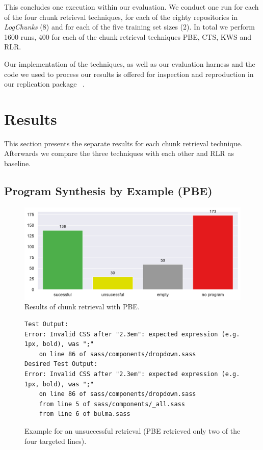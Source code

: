 This concludes one execution within our evaluation.
We conduct one run for each of the four chunk retrieval techniques,
for each of the eighty repositories in \emph{LogChunks} (8)
and for each of the five training set sizes (2).
In total we perform 1600 runs, 400 for each of the chunk retrieval
techniques PBE, CTS, KWS and RLR.

Our implementation of the techniques, as well as our evaluation
harness and the code we used to process our results is offered
for inspection and reproduction in our replication package
~\cite{brandt2020chunk-replication}.

\section{Results}
This section presents the separate results for each chunk retrieval
technique.
Afterwards we compare the three techniques with each other and RLR as
baseline.



\subsection{Program Synthesis by Example (PBE)}
\label{sec:r:pbe}

\begin{figure}[tbp]
		\centering
		\includegraphics[width=\columnwidth,
		clip]{img/big-study/failure-reason-pbe.pdf}
		\caption{Results of chunk retrieval with PBE.}
		\label{fig:failure-reason-PBE}
\end{figure}

\begin{figure}[!t]
  \centering
  \begin{lstlisting}[breaklines=true]
Test Output:
Error: Invalid CSS after "2.3em": expected expression (e.g.
1px, bold), was ";"
	on line 86 of sass/components/dropdown.sass
Desired Test Output:
Error: Invalid CSS after "2.3em": expected expression (e.g.
1px, bold), was ";"
	on line 86 of sass/components/dropdown.sass
	from line 5 of sass/components/_all.sass
	from line 6 of bulma.sass
  \end{lstlisting}
  \caption{Example for an unsuccessful retrieval (PBE retrieved only
  two of the four targeted lines).}
  \label{lst:pbe-unsuccessful}
\end{figure}

